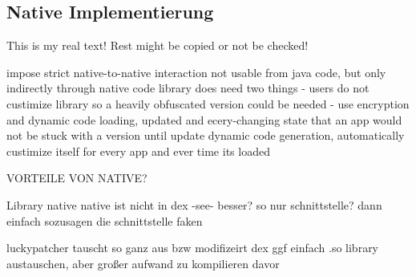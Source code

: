 \subsection{Native Implementierung} \label{subsection:counter-modifications-dynamic}
This is my real text! Rest might be copied or not be checked!

%
impose strict native-to-native interaction
not usable from java code, but only indirectly through native code library
does need two things
- users do not custimize library so a heavily obfuscated version could be needed
- use encryption and dynamic code loading, updated and ecery-changing state that an app would not be stuck with a version until update
dynamic code generation, automatically custimize itself for every app and ever time its loaded
\cite{munteanLicense}
%

VORTEILE VON NATIVE?


Library native\newline
native ist nicht in dex -see- besser?\newline
so nur schnittstelle? dann einfach sozusagen die schnittstelle faken\newline

luckypatcher tauscht so ganz aus bzw modifizeirt dex\newline
ggf einfach .so library austauschen, aber großer aufwand zu kompilieren davor\newline
